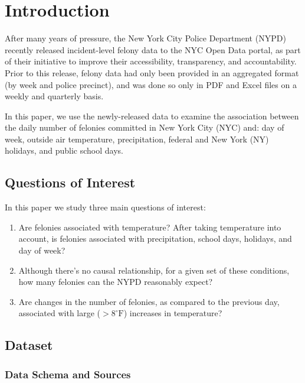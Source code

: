 \documentclass[11pt,notitlepage]{article}
\newcommand{\degf}{^\circ\text{F}}
\begin{document}
\pagebreak

\singlespacing



\section{Introduction}



After many years of pressure, the New York City Police Department (NYPD) recently released incident-level felony data to the NYC Open Data portal, as part of their initiative to improve their accessibility, transparency, and accountability. Prior to this release, felony data had only been provided in an aggregated format (by week and police precinct), and was done so only in PDF and Excel files on a weekly and quarterly basis.

In this paper, we use the newly-released data to examine the association between the daily number of felonies committed in New York City (NYC) and: day of week, outside air temperature, precipitation, federal and New York (NY) holidays, and public school days.

\subsection{Questions of Interest}

In this paper we study three main questions of interest:

\begin{enumerate}
\setlength\itemsep{-1pt}
\item Are felonies associated with temperature? After taking temperature into account, is felonies associated with precipitation, school days, holidays, and day of week?
\item Although there’s no causal relationship, for a given set of these conditions, how many felonies can the NYPD reasonably expect?
\item Are changes in the number of felonies, as compared to the previous day, associated with large ($>8 \degf$) increases in temperature?
\end{enumerate}



\subsection{Dataset}

\subsubsection{Data Schema and Sources}
\end{document}
